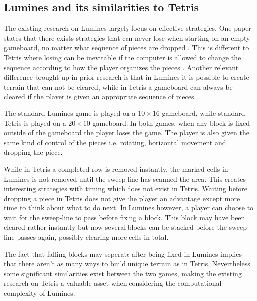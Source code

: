 \subsection{Lumines and its similarities to Tetris}
\label{subsub:sim}

The existing research on Lumines largely focus on effective strategies. One paper states that there exists strategies that can never lose when starting on an empty gameboard, no matter what sequence of pieces are dropped \cite{lumines}. This is different to Tetris where losing can be inevitable if the computer is allowed to change the sequence according to how the player organizes the pieces \cite[p. 4]{tetris}. Another relevant difference brought up in prior research is that in Lumines it is possible to create terrain that can not be cleared, while in Tetris a gameboard can always be cleared if the player is given an appropriate sequence of pieces.

The standard Lumines game is played on a $10 \times 16$-gameboard, while standard Tetris is played on a $20 \times 10$-gameboard. In both games, when any block is fixed outside of the gameboard the player loses the game. The player is also given the same kind of control of the pieces i.e. rotating, horizontal movement and dropping the piece.

While in Tetris a completed row is removed instantly, the marked cells in Lumines is not removed until the sweep-line has scanned the area. This creates interesting strategies with timing which does not exist in Tetris. Waiting before dropping a piece in Tetris does not give the player an advantage except more time to think about what to do next. In Lumines however, a player can choose to wait for the sweep-line to pass before fixing a block. This block may have been cleared rather instantly but now several blocks can be stacked before the sweep-line passes again, possibly clearing more cells in total.

The fact that falling blocks may seperate after being fixed in Lumines implies that there aren't as many ways to build unique terrain as in Tetris. Nevertheless some significant similarities exist between the two games, making the existing research on Tetris a valuable asset when considering the computational complexity of Lumines.
